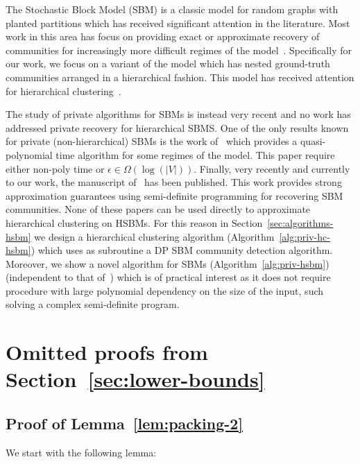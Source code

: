 The Stochastic Block Model (SBM) is a classic model for random graphs with planted partitions which has received  significant attention in the literature. Most work in this area has focus on providing exact or approximate recovery of communities for increasingly more difficult regimes of the model~\citep{MR3520025-Guedon16,montanari2016semidefinite, moitra2016robust,MR4115142,ding2022robust,Liu-Moitra-minimax}. Specifically for our work, we focus on a variant of the model which has nested ground-truth communities arranged in a hierarchical fashion. This model has received attention for hierarchical clustering~\citep{cohen2017hierarchical}.   

The study of private algorithms for SBMs is instead very recent and no work has addressed private recovery for hierarchical SBMS. One of the only results known for private (non-hierarchical) SBMs is the work of~\citet{seif2022differentially} which provides a quasi-polynomial time algorithm for some regimes of the model. This paper require either non-poly time or $\epsilon \in \Omega(\log(|V|))$. 
Finally, very recently and currently to our work, the manuscript of~\citet{chen2023private} has been published. This work provides strong approximation guarantees using semi-definite programming for recovering SBM communities.    
None of these papers can be used directly to approximate hierarchical clustering on HSBMs. For this reason in Section~\ref{sec:algorithms-hsbm} we design a hierarchical clustering algorithm (Algorithm~\ref{alg:priv-hc-hsbm}) which uses as subroutine a DP SBM community detection algorithm. Moreover, we show a novel algorithm for SBMs (Algorithm~\ref{alg:priv-hsbm}) (independent to that of~\citet{chen2023private}) which is of practical interest as it does not require procedure with large polynomial dependency on the size of the input, such  solving a complex semi-definite program.

\section{Omitted proofs from Section~\ref{sec:lower-bounds}}\label{app:lower-bounds}
\subsection{Proof of Lemma~\ref{lem:packing-2}}

We start with the following lemma:

